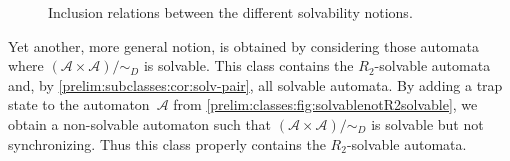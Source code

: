 \begin{figure}[h]
	\centering
{}
	\caption[Inclusion relations for solvability notions]{Inclusion relations between the different solvability notions.}
	\label{fig:solvability-notions}
\end{figure}

\begin{remark}
	Yet another, more general notion,
    is obtained by considering
	those automata where $(\mathcal A \times \mathcal A) / {\sim_D}$
	is solvable.
	This class contains the $R_2$-solvable automata
	and, by \cref{prelim:subclasses:cor:solv-pair},
	all solvable automata.
	By adding a trap state to the automaton~$\mathcal A$
	from \cref{prelim:classes:fig:solvablenotR2solvable},
	we obtain a non-solvable automaton
	such that $(\mathcal A \times \mathcal A) / {\sim_D}$
	is solvable but not synchronizing.
	Thus this class properly
	contains the $R_2$-solvable automata.	
\end{remark}